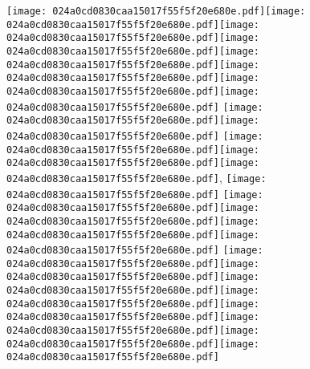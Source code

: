 \documentclass{article}
\newcommand{\origpg}[2]{\texttt{[image: 024a0cd0830caa15017f55f5f20e680e.pdf]}}
\begin{document}
{\vspace{0.626pt}\origpg4{85.303pt 149.89pt 96.956pt 166.03pt}\origpg4{96.859pt 149.89pt 104.03pt 166.03pt}\hspace{0.291pt}\origpg4{104.32pt 149.89pt 111.48pt 166.03pt}\origpg4{111.53pt 149.89pt 121.75pt 166.03pt}\origpg4{121.65pt 149.89pt 129.72pt 166.03pt}\hspace{-0.355pt}\origpg4{129.37pt 149.89pt 136.42pt 166.03pt}\hspace{0.161pt}\origpg4{136.58pt 149.89pt 144.65pt 166.03pt}\origpg4{144.75pt 149.89pt 152.17pt 166.03pt} \origpg4{156.53pt 149.89pt 165.16pt 166.03pt}\hspace{-0.21pt}\origpg4{164.96pt 149.89pt 172.12pt 166.03pt} \origpg4{176.25pt 149.89pt 183.18pt 166.03pt}\origpg4{183.23pt 149.89pt 190.28pt 166.03pt}\hspace{-0.307pt}\origpg4{189.97pt 149.89pt 198.04pt 166.03pt}, \origpg4{72.5mm 149.89pt 213.9pt 166.03pt} \origpg4{218.06pt 149.89pt 225.23pt 166.03pt}\origpg4{225.28pt 149.89pt 233.91pt 166.03pt}\origpg4{233.91pt 149.89pt 241.97pt 166.03pt}\origpg4{241.9pt 149.89pt 249.97pt 166.03pt} \origpg4{253.94pt 149.89pt 262.58pt 166.03pt}\origpg4{262.58pt 149.89pt 270.65pt 166.03pt}\hspace{0.145pt}\origpg4{270.79pt 149.89pt 278.86pt 166.03pt}\origpg4{278.96pt 149.89pt 286.13pt 166.03pt}\origpg4{286.18pt 149.89pt 293.23pt 166.03pt}\hspace{-0.307pt}\origpg4{292.92pt 149.89pt 300.99pt 166.03pt}\hspace{-0.355pt}\origpg4{300.64pt 149.89pt 307.69pt 166.03pt}\origpg4{307.63pt 149.89pt 318.47pt 166.03pt} 

}
\end{document}
